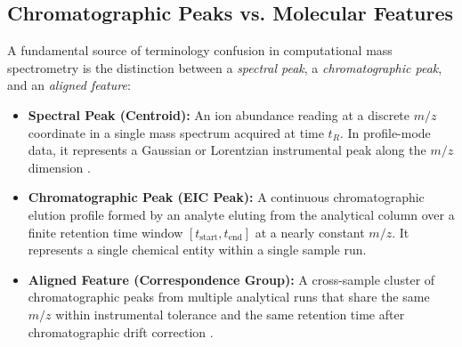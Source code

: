 \documentclass[11pt,twoside,openright]{book}
\begin{document}
\subsection{Chromatographic Peaks vs. Molecular Features}

A fundamental source of terminology confusion in computational mass spectrometry is the distinction between a \textit{spectral peak}, a \textit{chromatographic peak}, and an \textit{aligned feature}:
\begin{itemize}
    \item \textbf{Spectral Peak (Centroid):} An ion abundance reading at a discrete $m/z$ coordinate in a single mass spectrum acquired at time $t_R$. In profile-mode data, it represents a Gaussian or Lorentzian instrumental peak along the $m/z$ dimension \cite{chambers2012cross}.
    \item \textbf{Chromatographic Peak (EIC Peak):} A continuous chromatographic elution profile formed by an analyte eluting from the analytical column over a finite retention time window $[t_{\text{start}}, t_{\text{end}}]$ at a nearly constant $m/z$. It represents a single chemical entity within a single sample run.
    \item \textbf{Aligned Feature (Correspondence Group):} A cross-sample cluster of chromatographic peaks from multiple analytical runs that share the same $m/z$ within instrumental tolerance and the same retention time after chromatographic drift correction \cite{smith2006xcms}.
\end{itemize}
\end{document}
